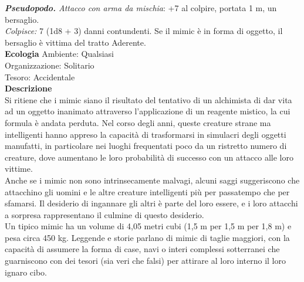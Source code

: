 \begin{multicols}{2}
\emph{\textbf{Pseudopodo.} Attacco con arma da mischia}: +7 al colpire, portata 1 m, un bersaglio.\\
\emph{Colpisce:} 7 (1d8 + 3) danni contundenti. Se il mimic è in forma di oggetto, il bersaglio è vittima del tratto Aderente.\\
\textbf{Ecologia}
Ambiente: Qualsiasi\\
Organizzazione: Solitario\\
Tesoro: Accidentale\\
\textbf{Descrizione}\\
Si ritiene che i mimic siano il risultato del tentativo di un alchimista di dar vita ad un oggetto inanimato attraverso l’applicazione di un reagente mistico, la cui formula è andata perduta. Nel corso degli anni, queste creature strane ma intelligenti hanno appreso la capacità di trasformarsi in simulacri degli oggetti manufatti, in particolare nei luoghi frequentati poco da un ristretto numero di creature, dove aumentano le loro probabilità di successo con un attacco alle loro vittime.\\
Anche se i mimic non sono intrinsecamente malvagi, alcuni saggi suggeriscono che attacchino gli uomini e le altre creature intelligenti più per passatempo che per sfamarsi. Il desiderio di ingannare gli altri è parte del loro essere, e i loro attacchi a sorpresa rappresentano il culmine di questo desiderio.\\
Un tipico mimic ha un volume di 4,05 metri cubi (1,5 m per 1,5 m per 1,8 m) e pesa circa 450 kg. Leggende e storie parlano di mimic di taglie maggiori, con la capacità di assumere la forma di case, navi o interi complessi sotterranei che guarniscono con dei tesori (sia veri che falsi) per attirare al loro interno il loro ignaro cibo.\\


\end{multicols}

